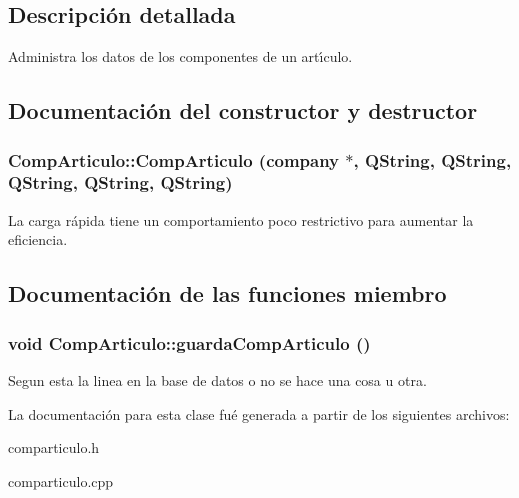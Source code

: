 \subsection{Descripci\'{o}n detallada}
Administra los datos de los componentes de un art\'{\i}culo. 



\subsection{Documentaci\'{o}n del constructor y destructor}
\subsubsection{\setlength{\rightskip}{0pt plus 5cm}Comp\-Articulo::Comp\-Articulo ({\bf company} $\ast$, QString, QString, QString, QString, QString)}\label{classCompArticulo_a2}


La carga r\'{a}pida tiene un comportamiento poco restrictivo para aumentar la eficiencia. 

\subsection{Documentaci\'{o}n de las funciones miembro}
\subsubsection{\setlength{\rightskip}{0pt plus 5cm}void Comp\-Articulo::guarda\-Comp\-Articulo ()}\label{classCompArticulo_a5}


Segun esta la linea en la base de datos o no se hace una cosa u otra. 

La documentaci\'{o}n para esta clase fu\'{e} generada a partir de los siguientes archivos:\begin{CompactItemize}
\item 
comparticulo.h\item 
comparticulo.cpp\end{CompactItemize}
